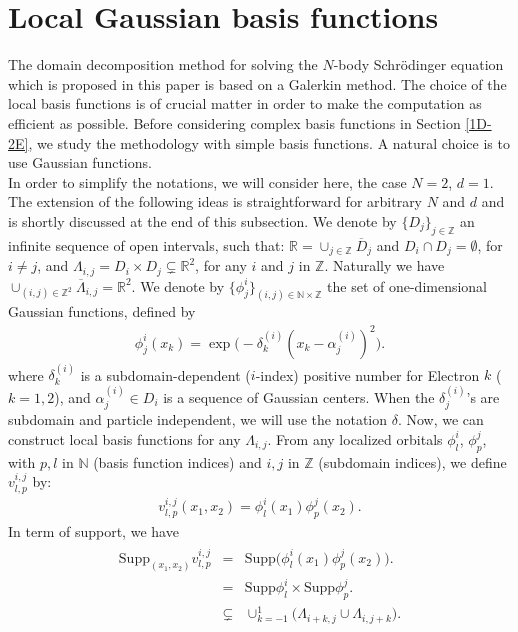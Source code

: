 \documentclass[11pt]{elsarticle}
\newcommand{\R} {\ensuremath{\mathbb{R}}}
\newcommand{\Z} {\ensuremath{\mathbb{Z}}}
\newcommand{\N} {\ensuremath{\mathbb{N}}}
\begin{document}
\section{Local Gaussian basis functions}\label{GBF}
The domain decomposition method for solving the $N$-body Schr\"odinger equation which is proposed in this paper is based on a Galerkin method. The choice of the local basis functions is of crucial matter in order to make the computation as efficient as possible. Before considering complex basis functions in Section \ref{1D-2E}, we study the methodology with simple basis functions. A natural choice is to use Gaussian functions. \\
In order to simplify the notations, we will consider here, the case $N=2$, $d=1$. The extension of the following ideas is straightforward for arbitrary $N$ and $d$ and is shortly discussed at the end of this subsection. We denote by $\big\{D_j\big\}_{j\in\Z}$ an infinite sequence of open intervals, such that: $\R=\cup_{j\in \Z}\overline{D}_j$ and $D_i\cap D_j=\emptyset$, for $i\neq j$, and $\Lambda_{i,j}=D_i\times D_j \subsetneq \R^2$, for any $i$ and $j$ in $\Z$. Naturally we have $\cup_{(i,j)\in \Z^2}\overline{\Lambda}_{i,j} = \R^2$. We denote by $\big\{\phi^{i}_j\big\}_{(i,j)\in \N\times\Z}$ the set of one-dimensional Gaussian functions, defined by
\begin{eqnarray}\label{gauss1d}
\phi_j^{i}(x_k) = \exp\big(-\delta_k^{(i)}(x_k-\alpha^{(i)}_j)^2\big).
\end{eqnarray}
where $\delta_k^{(i)}$ is a subdomain-dependent ($i$-index) positive number for Electron $k$ ($k=1,2$), and $\alpha_{j}^{(i)} \in D_i$ is a sequence of Gaussian centers.  When the $\delta_j^{(i)}$'s are subdomain and particle independent, we will use the notation $\delta$. Now, we can construct local basis functions for any $\Lambda_{i,j}$. From any localized orbitals $\phi^i_l$, $\phi_p^j$, with $p,l$ in $\N$ (basis function indices) and $i,j$ in $\Z$ (subdomain indices), we define $v^{i,j}_{l,p}$ by:
\begin{eqnarray*}
v^{i,j}_{l,p}(x_1,x_2) = \phi^i_l(x_1)\phi^j_p(x_2).
\end{eqnarray*}
In term of support, we have
\begin{eqnarray*}
\left.
\begin{array}{lcl} 
\mbox{Supp}_{(x_1,x_2)} v^{i,j}_{l,p} & = &\mbox{Supp}\big(\phi^i_l(x_1)\phi_p^j(x_2)\big).\\
&=& \mbox{Supp}\phi_l^i\times\mbox{Supp}\phi_p^j.\\
&\subsetneq &\cup_{k=-1}^1\big(\Lambda_{i+k,j}\cup\Lambda_{i,j+k}\big).
\end{array}
\right.
\end{eqnarray*}
\end{document}
